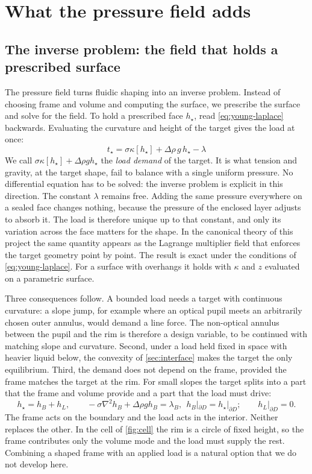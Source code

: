 \documentclass[11pt,a4paper]{article}
\numberwithin{equation}{section}
\begin{document}
\section{What the pressure field adds}\label{sec:demand}

\subsection{The inverse problem: the field that holds a prescribed surface}
The pressure field turns fluidic shaping into an inverse problem. Instead of
choosing frame and volume and computing the surface, we prescribe the surface
and solve for the field. To hold a prescribed face $h_\star$, read
\cref{eq:young-laplace} backwards.
Evaluating the curvature and height of the target gives the load at once:
\begin{equation}
 \boxed{\;t_\star=\sigma\kappa[h_\star]+\Delta\rho\,g\,h_\star-\lambda\;}
 \label{eq:demand}
\end{equation}
We call $\sigma\kappa[h_\star]+\Delta\rho gh_\star$ the \emph{load demand} of the
target. It is what tension and gravity, at the target shape, fail to balance
with a single uniform pressure. No differential equation has to be solved: the
inverse problem is explicit in this direction. The constant $\lambda$ remains
free. Adding the same pressure everywhere on a sealed face changes nothing,
because the pressure of the enclosed layer adjusts to absorb it. The load is
therefore unique up to that constant, and only its variation across the face
matters for the shape. In the canonical theory of this project the same
quantity appears as the Lagrange multiplier field that enforces the target
geometry point by point. The result is exact under the conditions of
\cref{eq:young-laplace}. For a surface with overhangs it holds with $\kappa$
and $z$ evaluated on a parametric surface.

Three consequences follow. A bounded load needs a target with continuous
curvature: a slope jump, for example where an optical pupil meets an
arbitrarily chosen outer annulus, would demand a line force. The non-optical
annulus between the pupil and the rim is therefore a design variable, to be
continued with matching slope and curvature. Second, under a load held fixed in
space with heavier liquid below, the convexity of \cref{sec:interface} makes
the target the only equilibrium. Third, the demand does not depend on the
frame, provided the frame matches the target at the rim. For small slopes the
target splits into a part that the frame and volume provide and a part that the
load must drive:
\begin{equation}
 h_\star=h_B+h_L,\qquad
 -\sigma\nabla^2h_B+\Delta\rho gh_B=\lambda_B,\ \ h_B|_{\partial D}=h_\star|_{\partial D};
 \qquad h_L|_{\partial D}=0 .
 \label{eq:decomposition}
\end{equation}
The frame acts on the boundary and the load acts in the interior. Neither
replaces the other. In the cell of \cref{fig:cell} the rim is a circle of fixed
height, so the frame contributes only the volume mode and the load must supply
the rest. Combining a shaped frame \cite{elgarisi2021preprint} with an applied
load is a natural option that we do not develop here.
\end{document}
